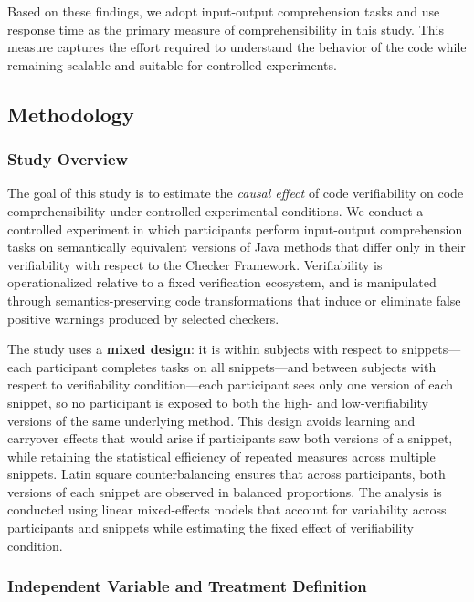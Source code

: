 Based on these findings, we adopt input-output comprehension tasks and use response time as the primary measure of comprehensibility in this study. This measure captures the effort required to understand the behavior of the code while remaining scalable and suitable for controlled experiments.

\subsection{Methodology}

\subsubsection{Study Overview}

The goal of this study is to estimate the \emph{causal effect} of code verifiability on code comprehensibility under controlled experimental conditions. We conduct a controlled experiment in which participants perform input-output comprehension tasks on semantically equivalent versions of Java methods that differ only in their verifiability with respect to the Checker Framework. Verifiability is operationalized relative to a fixed verification ecosystem, and is manipulated through semantics-preserving code transformations that induce or eliminate false positive warnings produced by selected checkers.

The study uses a \textbf{mixed design}: it is within subjects with respect to snippets---each participant completes tasks on all snippets---and between subjects with respect to verifiability condition---each participant sees only one version of each snippet, so no participant is exposed to both the high- and low-verifiability versions of the same underlying method. This design avoids learning and carryover effects that would arise if participants saw both versions of a snippet, while retaining the statistical efficiency of repeated measures across multiple snippets. Latin square counterbalancing ensures that across participants, both versions of each snippet are observed in balanced proportions. The analysis is conducted using linear mixed-effects models that account for variability across participants and snippets while estimating the fixed effect of verifiability condition.

\subsubsection{Independent Variable and Treatment Definition}

